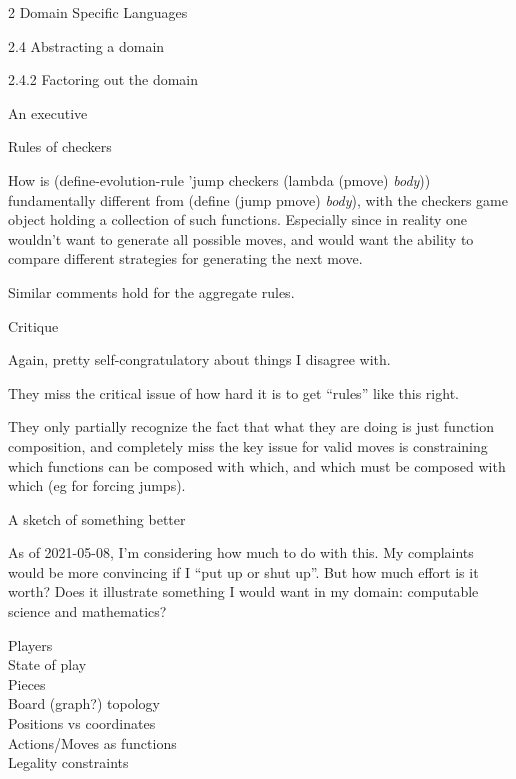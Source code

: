 \documentclass[12pt]{PalisadesLakesBook}
\begin{document}
\begin{plSection}{2 Domain Specific Languages}
\begin{plSection}{2.4 Abstracting a domain}
\begin{plSection}{2.4.2 Factoring out the domain}
\begin{plSection}{An executive}
\end{plSection}%
\begin{plSection}{Rules of checkers}

How is
{\schemeFont 
(define-evolution-rule 'jump checkers 
(lambda (pmove) {\itshape body}))}
fundamentally different from 
{\schemeFont 
(define (jump pmove) {\itshape body})},
with the checkers game object 
holding a collection of such functions.
Especially since in reality one wouldn't want to generate all
possible moves, and would want the ability to compare
different strategies for generating the next move.

Similar comments hold for the aggregate rules.

\end{plSection}%
\begin{plSection}{Critique}

Again, pretty self-congratulatory about things I disagree with.

They miss the critical issue of how hard it is to get
``rules'' like this right.

They only partially recognize the fact 
that what they are doing is just function composition,
and completely miss the key issue 
for valid moves is constraining which functions can be composed
with which, and which must be composed with which 
(eg for forcing jumps).

\end{plSection}%
\end{plSection}%
\begin{plSection}{A sketch of something better}

As of 2021-05-08, I'm considering how much to do with this.
My complaints would be more convincing if I ``put up or shut up''.
But how much effort is it worth?
Does it illustrate something I would want in my domain:
computable science and mathematics?

\begin{description}
\item[Players]
\item[State of play]
\item[Pieces]
\item[Board (graph?) topology]
\item[Positions vs coordinates]
\item[Actions/Moves as functions]
\item[Legality constraints]
\end{description}



\end{plSection}
\end{plSection}
\end{plSection}
\end{document}

